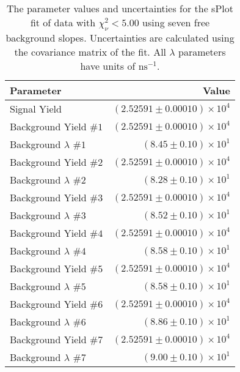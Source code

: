 
\begin{table}[ht]
    \begin{center}
        \begin{tabular}{lr}\toprule
            Parameter & Value \\\midrule
            Signal Yield & $(2.52591 \pm 0.00010) \times 10^{4}$ \\
            Background Yield $\#1$ & $(2.52591 \pm 0.00010) \times 10^{4}$ \\
            Background $\lambda$ $\#1$ & $(8.45 \pm 0.10) \times 10^{1}$ \\
            Background Yield $\#2$ & $(2.52591 \pm 0.00010) \times 10^{4}$ \\
            Background $\lambda$ $\#2$ & $(8.28 \pm 0.10) \times 10^{1}$ \\
            Background Yield $\#3$ & $(2.52591 \pm 0.00010) \times 10^{4}$ \\
            Background $\lambda$ $\#3$ & $(8.52 \pm 0.10) \times 10^{1}$ \\
            Background Yield $\#4$ & $(2.52591 \pm 0.00010) \times 10^{4}$ \\
            Background $\lambda$ $\#4$ & $(8.58 \pm 0.10) \times 10^{1}$ \\
            Background Yield $\#5$ & $(2.52591 \pm 0.00010) \times 10^{4}$ \\
            Background $\lambda$ $\#5$ & $(8.58 \pm 0.10) \times 10^{1}$ \\
            Background Yield $\#6$ & $(2.52591 \pm 0.00010) \times 10^{4}$ \\
            Background $\lambda$ $\#6$ & $(8.86 \pm 0.10) \times 10^{1}$ \\
            Background Yield $\#7$ & $(2.52591 \pm 0.00010) \times 10^{4}$ \\
            Background $\lambda$ $\#7$ & $(9.00 \pm 0.10) \times 10^{1}$ \\\bottomrule
        \end{tabular}
        \caption{The parameter values and uncertainties for the sPlot fit of data with $\chi^2_\nu < 5.00$ using seven free background slopes. Uncertainties are calculated using the covariance matrix of the fit. All $\lambda$ parameters have units of $\si{\nano\second}^{-1}$.}\label{tab:splot-fit-results-chisqdof-5.00-free-7}
    \end{center}
\end{table}
